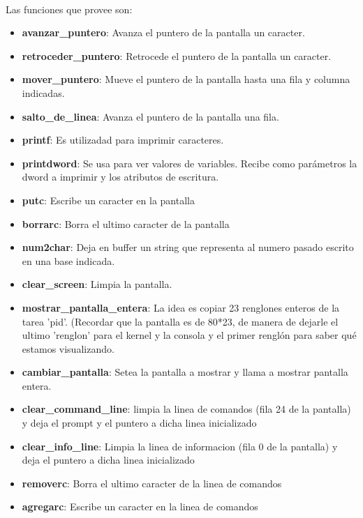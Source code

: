 \documentclass[11pt, a4paper]{article}
\begin{document}
\paragraph{}
Las funciones que provee son:
\begin{itemize} 
\item \textbf{avanzar\_puntero}: Avanza el puntero de la pantalla un caracter. 
\item \textbf{retroceder\_puntero}: Retrocede el puntero de la pantalla un caracter. 
\item \textbf{mover\_puntero}: Mueve el puntero de la pantalla hasta una fila y columna indicadas. 
\item \textbf{salto\_de\_linea}: Avanza el puntero de la pantalla una fila. 
\item \textbf{printf}: Es utilizadad para imprimir caracteres.
\item \textbf{printdword}: Se usa para ver valores de variables. Recibe como parámetros la dword a imprimir y los atributos de escritura.
\item \textbf{putc}: Escribe un caracter en la pantalla 
\item \textbf{borrarc}: Borra el ultimo caracter de la pantalla 
\item \textbf{num2char}: Deja en buffer un string que representa al numero pasado escrito en una base indicada. 
\item \textbf{clear\_screen}: Limpia la pantalla. 
\item \textbf{mostrar\_pantalla\_entera}: La idea es copiar 23 renglones enteros de la tarea 'pid'. (Recordar que la pantalla es de 80*23, de manera de dejarle el ultimo 'renglon' para el kernel y la consola y el primer renglón para saber qué estamos visualizando.
\item \textbf{cambiar\_pantalla}: Setea la pantalla a mostrar y llama a mostrar pantalla entera.
\item \textbf{clear\_command\_line}: limpia la linea de comandos (fila 24 de la pantalla) y deja el prompt y el puntero a dicha linea inicializado 
\item \textbf{clear\_info\_line}: Limpia la linea de informacion (fila 0 de la pantalla) y deja el puntero a dicha linea inicializado 
\item \textbf{removerc}: Borra el ultimo caracter de la linea de comandos 
\item \textbf{agregarc}: Escribe un caracter en la linea de comandos
\end{itemize}
\end{document}
